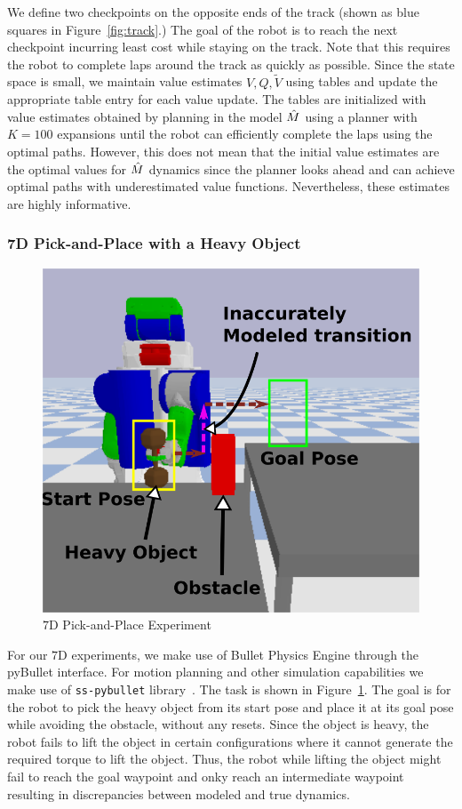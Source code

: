 We define two checkpoints on the opposite ends of the track (shown as
blue squares in Figure~\ref{fig:track}.) The goal of the robot is to
reach the next checkpoint incurring least cost while staying on the
track. Note that this
requires the robot to complete laps around the track as quickly as
possible. Since the state space is small, we maintain value estimates
$V, Q, \tilde{V}$ using tables and update the appropriate table entry
for each value update. The tables are initialized with value estimates
obtained by planning in the model $\hat{M}$ using a planner with $K=100$
expansions until the robot can efficiently complete the laps using the
optimal paths. However, this does not mean that the initial value
estimates are the optimal values for $\hat{M}$ dynamics since the
planner looks ahead and can achieve optimal paths with underestimated
value functions. Nevertheless, these estimates are highly informative.

\subsubsection{7D Pick-and-Place with a Heavy Object}
\label{sec:7d-pick-place}

\begin{figure}[t]
  \centering
  \includegraphics[width=0.5\linewidth]{figures/cmaxpp/intro_grasp_new.png}
  \caption{$7$D Pick-and-Place Experiment}
  \label{fig:pr2}
\end{figure}

For our $7$D experiments, we make use of Bullet Physics Engine through
the pyBullet interface. For motion planning and other simulation
capabilities we make use of \texttt{ss-pybullet}
library~\cite{sspybullet}. The task is shown in
Figure~\ref{fig:pr2}. The goal is for the robot to pick the heavy
object from its start pose and place it at its goal pose while
avoiding the obstacle, without any resets. Since the object is heavy,
the robot fails to lift the object in certain configurations where it
cannot generate the required torque to lift the object. Thus, the
robot while lifting the object might fail to reach the goal waypoint
and onky reach an intermediate waypoint resulting in discrepancies
between modeled and true dynamics.


